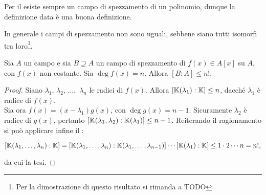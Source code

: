 \begin{remark*}
    Per il  esiste sempre un campo di spezzamento
    di un polinomio, dunque la definizione data è una buona definizione.
\end{remark*}

\begin{remark*}
    In generale i campi di spezzamento non sono uguali, sebbene siano tutti
    isomorfi tra loro\footnote{Per la dimostrazione di questo risultato
        si rimanda a TODO}.
\end{remark*}

\begin{theorem}
    Sia $A$ un campo e sia $B \supseteq A$ un campo di spezzamento
    di $f(x) \in A[x]$ su $A$, con $f(x)$ non costante. Sia $\deg f(x) = n$.
    Allora $[B : A] \leq n!$.
\end{theorem}

\begin{proof}
    Siano $\lambda_1$, $\lambda_2,\,\ldots,$ $\lambda_n$ le radici
    di $f(x)$. Allora $[\mathbb{K}(\lambda_1) : \mathbb{K}] \leq n$, dacché
    $\lambda_1$ è radice di $f(x)$. \\
    
    Sia ora $f(x)=(x-\lambda_1)g(x)$, con $\deg g(x) = n-1$. Sicuramente
    $\lambda_2$ è radice di $g(x)$, pertanto $[\mathbb{K}(\lambda_1, \lambda_2) : \mathbb{K}(\lambda_1)] \leq n-1$. Reiterando il ragionamento si può applicare infine il :
    
    \[ [\mathbb{K}(\lambda_1, \ldots, \lambda_n) : \mathbb{K}] = [\mathbb{K}(\lambda_1, \ldots, \lambda_n) : \mathbb{K}(\lambda_1, \ldots, \lambda_{n-1})] \cdots [\mathbb{K}(\lambda_1) : \mathbb{K}] \leq 1 \cdot 2 \cdots n = n!, \]
    
    \vskip 0.1in
    
    da cui la tesi.
\end{proof}

